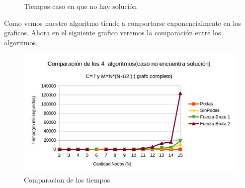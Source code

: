  \begin{figure}
 \centering
 \caption{Tiempos caso en que no hay solución}
 \label{tiempos}
\end{figure}


Como vemos nuestro algoritmo tiende a comportarse exponencialmente en los graficos. 
Ahora en el siguiente grafico veremos la comparación  entre los algoritmos.


\begin{figure}[htb]
  \begin{center}
      \includegraphics[scale=0.60]{imagenes/imgEjercicio2/C4ANoSolucion.jpg}
  \end{center}
  \caption{Comparacion de los tiempos}
\end{figure}


